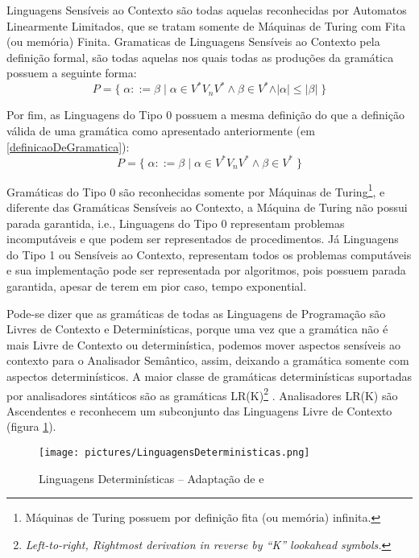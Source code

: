 {    Linguagens Sensíveis ao Contexto são todas aquelas
    reconhecidas por Automatos Linearmente Limitados,
    que se tratam somente de Máquinas de Turing com Fita (ou memória) Finita.
    Gramaticas de Linguagens Sensíveis ao Contexto pela definição formal,
    são todas aquelas nos quais todas as produções da gramática possuem a seguinte forma:
    $$ P = \{\; \alpha ::= \beta \;|\; \alpha \in V^* V_n V^* \land \beta \in V^*
                \land \vert\alpha\vert \leq \vert\beta\vert \;\} $$

    Por fim,
    as Linguagens do Tipo 0 possuem a mesma definição do que a definição válida de
    uma gramática como apresentado anteriormente (em \ref{definicaoDeGramatica}):
    $$ P = \{\; \alpha ::= \beta \;|\; \alpha \in V^* V_n V^* \land \beta \in V^* \;\} $$

    Gramáticas do Tipo 0 são reconhecidas somente por Máquinas de Turing\footnote{Máquinas
    de Turing possuem por definição fita (ou memória) infinita.
    },
    e diferente das Gramáticas Sensíveis ao Contexto,
    a Máquina de Turing não possui parada garantida,
    i.e.,
    Linguagens do Tipo 0 representam problemas incomputáveis e
    que podem ser representados de procedimentos.
    Já Linguagens do Tipo 1 ou Sensíveis ao Contexto,
    representam todos os problemas computáveis e
    sua implementação pode ser representada por algoritmos,
    pois possuem parada garantida,
    apesar de terem em pior caso,
    tempo exponential.

    Pode-se dizer que as gramáticas de todas as Linguagens de Programação são Livres de Contexto e
    Determinísticas,
    porque uma vez que a gramática não é mais Livre de Contexto ou determinística,
    podemos mover aspectos sensíveis ao contexto para o Analisador Semântico,
    assim,
    deixando a gramática somente com aspectos determinísticos.
    A maior classe de gramáticas determinísticas suportadas por analisadores
    sintáticos são as gramáticas LR(K)\footnote{\textit{Left-to-right,
    Rightmost derivation in reverse by ``K'' lookahead symbols.
    }} .
    Analisadores LR(K) são Ascendentes e
    reconhecem um subconjunto das Linguagens Livre de Contexto
    (figura \ref{fig:pictures/LinguagensDeterministicas.png}).
    \begin{figure}[H]
    \centering
    \texttt{[image: pictures/LinguagensDeterministicas.png]}
    \caption{Linguagens Determinísticas -- Adaptação de  e }
    \label{fig:pictures/LinguagensDeterministicas.png}
    \end{figure}

}
